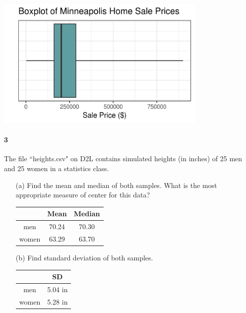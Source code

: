 \documentclass{article}
\begin{document}
\begin{flushleft}
\begin{itemize}
\bigskip
{\centering
\includegraphics[width=4in]{images/grp03_Q2_c}
\par}

\bigskip
{}
\end{itemize}

\newpage
\paragraph{3} The file ``heights.csv" on D2L contains simulated heights (in inches) of 25 men and 25 women in a statistics class. 
\begin{itemize}
\item [(a)] Find the mean and median of both samples. What is the most appropriate measure of center for this data?\\

\bigskip
{\centering
\begin{tabular}{ccc}
 & Mean & Median \\ 
  \hline
men & 70.24 & 70.30 \\ 
  women & 63.29 & 63.70 \\ 
\end{tabular}
\par}

\bigskip
{}
\vspace{.5in}

\item[(b)] Find standard deviation of both samples.\\

\bigskip
{\centering
\begin{tabular}{cc}
 & SD \\ 
  \hline
men & 5.04 in \\ 
  women & 5.28 in \\ 
\end{tabular}
\par}
\vspace{.5in}



\end{itemize}
\end{flushleft}
\end{document}
